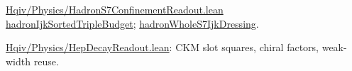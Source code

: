 \documentclass[11pt]{amsart}
\newcommand{\leanrepo}{https://github.com/HQIV/hqiv-lean/blob/main}
\newcommand{\leanfile}[1]{\href{\leanrepo/#1}{\footnotesize\url{#1}}}
\newcommand{\leanid}[1]{{\footnotesize\ttfamily\url{#1}}}
\newenvironment{leanindex}{%
  \begin{description}[style=nextline,leftmargin=0pt,labelindent=0pt,
    labelsep=0.5em,itemsep=0.75\baselineskip]%
  \footnotesize\raggedright\sloppy
}{%
  \end{description}%
}
\begin{document}
\begin{leanindex}
\item[\phantomsection\label{lean:s7-glueball-track}Whole-hadron $S^7$ + glueball research track.]
  \leanfile{Hqiv/Physics/HadronS7ConfinementReadout.lean}\\
  \leanid{hadronIjkSortedTripleBudget}; \leanid{hadronWholeS7IjkDressing}.

\item[\phantomsection\label{lean:hep-decay}HEP decay readout (downstream).]
  \leanfile{Hqiv/Physics/HepDecayReadout.lean}:
  CKM slot squares, chiral factors, weak-width reuse.

\end{leanindex}

\clearpage


\end{document}
